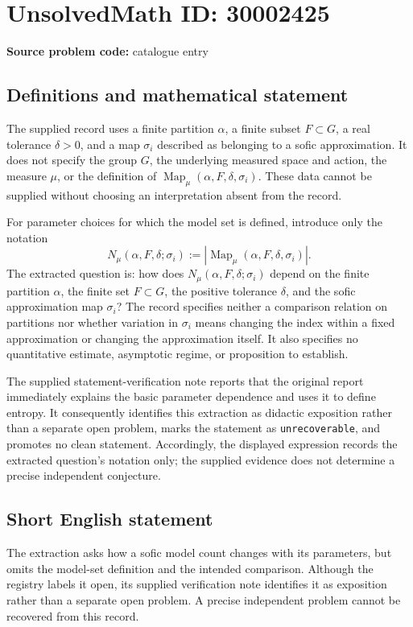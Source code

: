 \documentclass[11pt]{article}
\begin{document}
\section*{UnsolvedMath ID: 30002425}
\textbf{Source problem code:} catalogue entry
\subsection{Definitions and mathematical statement}
The supplied record uses a finite partition \(\alpha\), a finite subset \(F\subset G\), a real tolerance \(\delta>0\), and a map \(\sigma_i\) described as belonging to a sofic approximation. It does not specify the group \(G\), the underlying measured space and action, the measure \(\mu\), or the definition of \(\operatorname{Map}_{\mu}(\alpha,F,\delta,\sigma_i)\). These data cannot be supplied without choosing an interpretation absent from the record.

For parameter choices for which the model set is defined, introduce only the notation
\[
N_{\mu}(\alpha,F,\delta;\sigma_i)
:=\left|\operatorname{Map}_{\mu}(\alpha,F,\delta,\sigma_i)\right|.
\]
The extracted question is: how does \(N_{\mu}(\alpha,F,\delta;\sigma_i)\) depend on the finite partition \(\alpha\), the finite set \(F\subset G\), the positive tolerance \(\delta\), and the sofic approximation map \(\sigma_i\)? The record specifies neither a comparison relation on partitions nor whether variation in \(\sigma_i\) means changing the index within a fixed approximation or changing the approximation itself. It also specifies no quantitative estimate, asymptotic regime, or proposition to establish.

The supplied statement-verification note reports that the original report immediately explains the basic parameter dependence and uses it to define entropy. It consequently identifies this extraction as didactic exposition rather than a separate open problem, marks the statement as \texttt{unrecoverable}, and promotes no clean statement. Accordingly, the displayed expression records the extracted question's notation only; the supplied evidence does not determine a precise independent conjecture.
\subsection{Short English statement}
The extraction asks how a sofic model count changes with its parameters, but omits the model-set definition and the intended comparison. Although the registry labels it open, its supplied verification note identifies it as exposition rather than a separate open problem. A precise independent problem cannot be recovered from this record.
\end{document}

